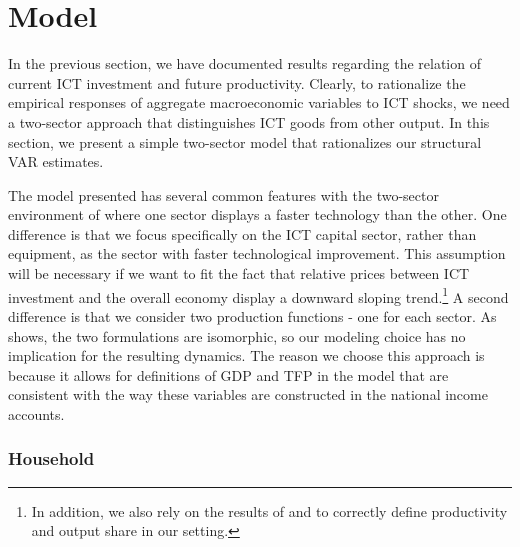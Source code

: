 \documentclass[12pt]{article}
\begin{document}


\section{Model}\label{section:theory}

In the previous section, we have documented results regarding the relation of current ICT investment and future productivity. Clearly, to rationalize the empirical responses of aggregate macroeconomic variables to ICT shocks, we need a two-sector approach that distinguishes ICT goods from other output. In this section, we present a simple two-sector model that rationalizes our structural VAR estimates. 


The model presented has several common features with the two-sector environment of \cite{greenwood1997long} where one sector displays a faster technology than the other. One difference is that we focus specifically on the ICT capital sector, rather than equipment, as the sector with faster technological improvement. This assumption will be necessary if we want to fit the fact that relative prices between ICT investment and the overall economy display a downward sloping trend.\footnote{In addition, we also rely on the results of \cite{whelan2003two} and \cite{oulton2007investment} to correctly define productivity and output share in our setting.} A second difference is that  we consider two production functions - one for each sector. As \cite{oulton2007investment} shows, the two formulations are isomorphic, so our modeling choice has no implication for the resulting dynamics. The reason we choose this approach is because it allows for definitions of GDP and TFP in the model that are consistent with the way these variables are constructed in the national income accounts.

\subsubsection{Household}
\end{document}
